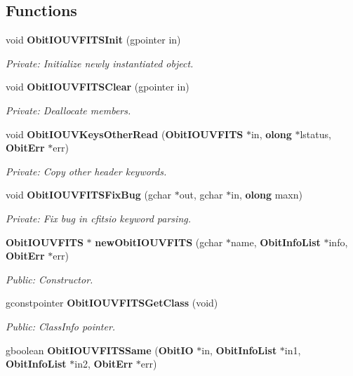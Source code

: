\subsection*{Functions}
\begin{CompactItemize}
\item 
void {\bf Obit\-IOUVFITSInit} (gpointer in)
\begin{CompactList}\small\item\em Private: Initialize newly instantiated object. \item\end{CompactList}\item 
void {\bf Obit\-IOUVFITSClear} (gpointer in)
\begin{CompactList}\small\item\em Private: Deallocate members. \item\end{CompactList}\item 
void {\bf Obit\-IOUVKeys\-Other\-Read} ({\bf Obit\-IOUVFITS} $\ast$in, {\bf olong} $\ast$lstatus, {\bf Obit\-Err} $\ast$err)
\begin{CompactList}\small\item\em Private: Copy other header keywords. \item\end{CompactList}\item 
void {\bf Obit\-IOUVFITSFix\-Bug} (gchar $\ast$out, gchar $\ast$in, {\bf olong} maxn)
\begin{CompactList}\small\item\em Private: Fix bug in cfitsio keyword parsing. \item\end{CompactList}\item 
{\bf Obit\-IOUVFITS} $\ast$ {\bf new\-Obit\-IOUVFITS} (gchar $\ast$name, {\bf Obit\-Info\-List} $\ast$info, {\bf Obit\-Err} $\ast$err)
\begin{CompactList}\small\item\em Public: Constructor. \item\end{CompactList}\item 
gconstpointer {\bf Obit\-IOUVFITSGet\-Class} (void)
\begin{CompactList}\small\item\em Public: Class\-Info pointer. \item\end{CompactList}\item 
gboolean {\bf Obit\-IOUVFITSSame} ({\bf Obit\-IO} $\ast$in, {\bf Obit\-Info\-List} $\ast$in1, {\bf Obit\-Info\-List} $\ast$in2, {\bf Obit\-Err} $\ast$err)

\end{CompactItemize}
